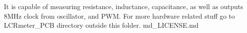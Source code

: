 It is capable of measuring resistance, inductance, capacitance, as well as outputs 8M\+Hz clock from oscillator, and P\+WM. For more hardware related stuff go to L\+C\+Rmeter\+\_\+\+P\+CB directory outside this folder. md\+\_\+\+L\+I\+C\+E\+N\+S\+E.\+md 